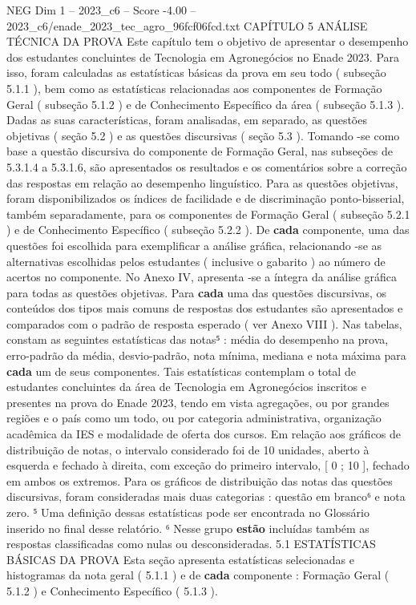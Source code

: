 \begin{textsample}{NEG Dim 1 – 2023\_c6 – Score -4.00 – 2023\_c6/enade\_2023\_tec\_agro\_96fcf06fcd.txt}  \label{ex:f1_neg_203}
CAPÍTULO 5 ANÁLISE TÉCNICA DA PROVA Este capítulo tem o objetivo de apresentar o desempenho dos estudantes concluintes de Tecnologia em Agronegócios no Enade 2023.
Para isso, foram calculadas as estatísticas básicas da prova em seu todo ( subseção 5.1.1 ), bem como as estatísticas relacionadas aos componentes de Formação Geral ( subseção 5.1.2 ) e de Conhecimento Específico da área ( subseção 5.1.3 ).
Dadas as suas características, foram analisadas, em separado, as questões objetivas ( seção 5.2 ) e as questões discursivas ( seção 5.3 ).
Tomando -se como base a questão discursiva do componente de Formação Geral, nas subseções de 5.3.1.4 a 5.3.1.6, são apresentados os resultados e os comentários sobre a correção das respostas em relação ao desempenho linguístico.
Para as questões objetivas, foram disponibilizados os índices de facilidade e de discriminação ponto-bisserial, também separadamente, para os componentes de Formação Geral ( subseção 5.2.1 ) e de Conhecimento Específico ( subseção 5.2.2 ).
De \textbf{cada} componente, uma das questões foi escolhida para exemplificar a análise gráfica, relacionando -se as alternativas escolhidas pelos estudantes ( inclusive o gabarito ) ao número de acertos no componente.
No Anexo IV, apresenta -se a íntegra da análise gráfica para todas as questões objetivas.
Para \textbf{cada} uma das questões discursivas, os conteúdos dos tipos mais comuns de respostas dos estudantes são apresentados e comparados com o padrão de resposta esperado ( ver Anexo VIII ).
Nas tabelas, constam as seguintes estatísticas das notas⁵ : média do desempenho na prova, erro-padrão da média, desvio-padrão, nota mínima, mediana e nota máxima para \textbf{cada} um de seus componentes.
Tais estatísticas contemplam o total de estudantes concluintes da área de Tecnologia em Agronegócios inscritos e presentes na prova do Enade 2023, tendo em vista agregações, ou por grandes regiões e o país como um todo, ou por categoria administrativa, organização acadêmica da IES e modalidade de oferta dos cursos.
Em relação aos gráficos de distribuição de notas, o intervalo considerado foi de 10 unidades, aberto à esquerda e fechado à direita, com exceção do primeiro intervalo, [ 0 ; 10 ], fechado em ambos os extremos.
Para os gráficos de distribuição das notas das questões discursivas, foram consideradas mais duas categorias : questão em branco⁶ e nota zero. ⁵ Uma definição dessas estatísticas pode ser encontrada no Glossário inserido no final desse relatório. ⁶ Nesse grupo \textbf{estão} incluídas também as respostas classificadas como nulas ou desconsideradas. 5.1 ESTATÍSTICAS BÁSICAS DA PROVA Esta seção apresenta estatísticas selecionadas e histogramas da nota geral ( 5.1.1 ) e de \textbf{cada} componente : Formação Geral ( 5.1.2 ) e Conhecimento Específico ( 5.1.3 ).

\end{textsample}

